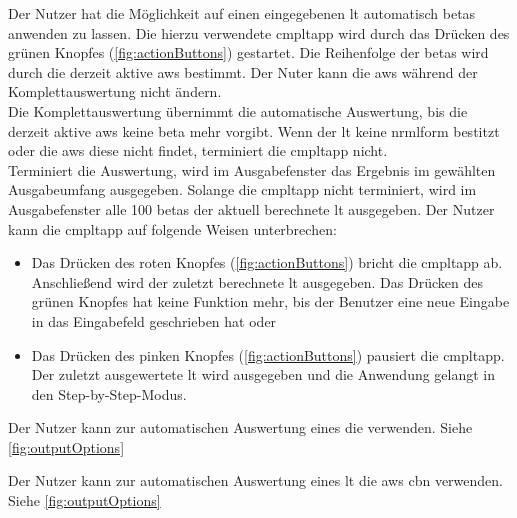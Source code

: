 \documentclass[parskip=full,11pt,twoside]{scrartcl}
\begin{document}
Der Nutzer hat die Möglichkeit auf einen eingegebenen \gls{lt} automatisch \glspl{beta} anwenden zu lassen. 
Die hierzu verwendete \gls{cmpltapp} wird durch das Drücken des grünen Knopfes (\cref{fig:actionButtons}) gestartet. %
Die Reihenfolge der \glspl{beta} wird durch die derzeit aktive \gls{aws} bestimmt.
Der Nuter kann die \gls{aws} während der Komplettauswertung nicht ändern.\\
Die Komplettauswertung übernimmt die automatische Auswertung, bis die derzeit aktive \gls{aws} keine \gls{beta} mehr vorgibt.
Wenn der \gls{lt} keine \gls{nrmlform} bestitzt oder die \gls{aws} diese nicht findet, terminiert die \gls{cmpltapp} nicht. \\
Terminiert die Auswertung, wird im Ausgabefenster das Ergebnis im gewählten Ausgabeumfang ausgegeben. %
Solange die \gls{cmpltapp} nicht terminiert, wird im Ausgabefenster alle 100 \glspl{beta} der aktuell berechnete \gls{lt} ausgegeben.
Der Nutzer kann die \gls{cmpltapp} auf folgende Weisen unterbrechen:
\begin{itemize}
	\item Das Drücken des roten Knopfes (\cref{fig:actionButtons}) bricht die \gls{cmpltapp} ab. 
	Anschließend wird der zuletzt berechnete \gls{lt} ausgegeben. Das Drücken des grünen Knopfes hat keine Funktion mehr, bis der Benutzer eine neue Eingabe in das Eingabefeld geschrieben hat oder %
	\item Das Drücken des pinken Knopfes (\cref{fig:actionButtons}) pausiert die \gls{cmpltapp}. %
	Der zuletzt ausgewertete \gls{lt} wird ausgegeben und die Anwendung gelangt in den Step-by-Step-Modus.
\end{itemize}


Der Nutzer kann zur automatischen Auswertung eines  die  verwenden. Siehe \cref{fig:outputOptions}

Der Nutzer kann zur automatischen Auswertung eines \gls{lt} die \gls{aws} \gls{cbn} verwenden. Siehe \cref{fig:outputOptions}
\end{document}
